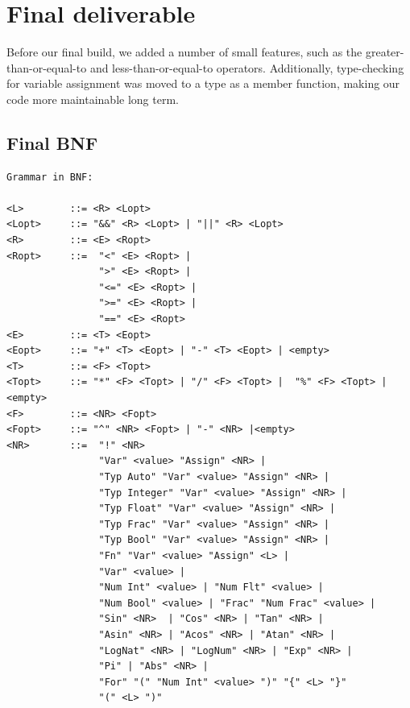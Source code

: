 \documentclass[a4paper, oneside, 11pt]{report}
\begin{document}

    \chapter{Final deliverable}\label{Impl}

    Before our final build, we added a number of small features, such as the greater-than-or-equal-to and less-than-or-equal-to operators. Additionally, type-checking for variable assignment was moved to a type as a member function, making our code more maintainable long term.

    \section{Final BNF}
    \begin{verbatim}
Grammar in BNF:

<L>        ::= <R> <Lopt>
<Lopt>     ::= "&&" <R> <Lopt> | "||" <R> <Lopt>
<R>        ::= <E> <Ropt>
<Ropt>     ::=  "<" <E> <Ropt> |
                ">" <E> <Ropt> |
                "<=" <E> <Ropt> |
                ">=" <E> <Ropt> |
                "==" <E> <Ropt>
<E>        ::= <T> <Eopt>
<Eopt>     ::= "+" <T> <Eopt> | "-" <T> <Eopt> | <empty>
<T>        ::= <F> <Topt>
<Topt>     ::= "*" <F> <Topt> | "/" <F> <Topt> |  "%" <F> <Topt> |<empty>
<F>        ::= <NR> <Fopt>
<Fopt>     ::= "^" <NR> <Fopt> | "-" <NR> |<empty>
<NR>       ::=  "!" <NR>
                "Var" <value> "Assign" <NR> |
                "Typ Auto" "Var" <value> "Assign" <NR> |
                "Typ Integer" "Var" <value> "Assign" <NR> |
                "Typ Float" "Var" <value> "Assign" <NR> |
                "Typ Frac" "Var" <value> "Assign" <NR> |
                "Typ Bool" "Var" <value> "Assign" <NR> |
                "Fn" "Var" <value> "Assign" <L> |
                "Var" <value> |
                "Num Int" <value> | "Num Flt" <value> |
                "Num Bool" <value> | "Frac" "Num Frac" <value> |
                "Sin" <NR>  | "Cos" <NR> | "Tan" <NR> |
                "Asin" <NR> | "Acos" <NR> | "Atan" <NR> |
                "LogNat" <NR> | "LogNum" <NR> | "Exp" <NR> |
                "Pi" | "Abs" <NR> |
                "For" "(" "Num Int" <value> ")" "{" <L> "}"
                "(" <L> ")"
    \end{verbatim}
\end{document}
